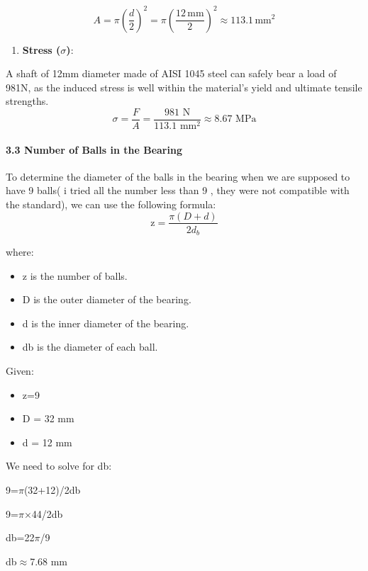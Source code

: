 \documentclass[../../main]{subfiles}
\begin{document}
$$A=\pi\left(\frac{d}{2}\right)^2=\pi\left(\frac{12\, \text{mm}}{2}\right)^2 \approx 113.1\, \text{mm}^2$$

\begin{enumerate}
\def\labelenumi{\arabic{enumi}.}
\setcounter{enumi}{1}
\item
  \textbf{Stress (}$\sigma$\textbf{)}:
\end{enumerate}


A shaft of 12mm diameter made of AISI 1045 steel can safely bear a load of 981N, as the induced stress is well within the material's yield and ultimate tensile strengths.
$$
\sigma = \frac{F}{A} = \frac{981 \text{ N}}{113.1 \text{ mm}^2} \approx 8.67 \text{ MPa}
$$

\paragraph{3.3 Number of Balls in the Bearing}

To determine the diameter of the balls in the bearing when we are
supposed to have 9 balls( i tried all the number less than 9 , they were
not compatible with the standard), we can use the following formula:
\begin{equation}
  \text{z} = \frac{\pi (D + d)}{2 d_b}
  \label{eq4}
\end{equation}

where:

\begin{itemize}
\item
  z is the number of balls.
\item
  D is the outer diameter of the bearing.
\item
  d is the inner diameter of the bearing.
\item
  db is the diameter of each ball.
\end{itemize}

Given:

\begin{itemize}
\item
  z=9
\item
  D = 32 mm
\item
  d = 12 mm
\end{itemize}

We need to solve for db:

9=$\pi$(32+12)/2db

9=$\pi$×44/2db

db=22$\pi$/9

db$\approx$7.68 mm
\end{document}
